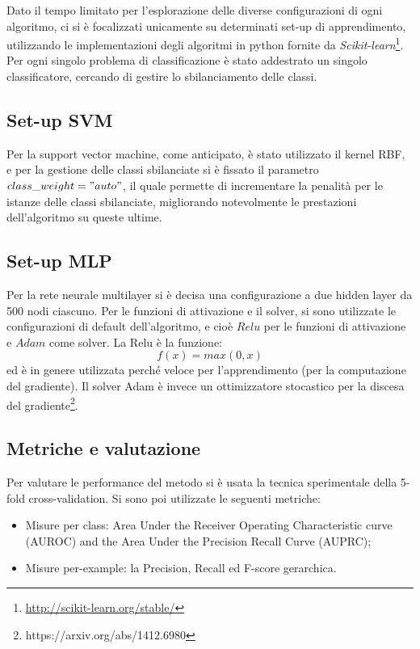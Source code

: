 \documentclass{article}
\begin{document}
Dato il tempo limitato per l'esplorazione delle diverse configurazioni di ogni algoritmo, ci si è focalizzati unicamente su determinati set-up di apprendimento, utilizzando le implementazioni degli algoritmi in python fornite da \textit{Scikit-learn}\footnote{\url{http://scikit-learn.org/stable/}}.
\newline
\newline
Per ogni singolo problema di classificazione è stato addestrato un singolo classificatore, cercando di gestire lo sbilanciamento delle classi.

\subsection{Set-up SVM}
Per la support vector machine, come anticipato, è stato utilizzato il kernel RBF, e per la gestione delle classi sbilanciate si è fissato il parametro $class\_weight="auto"$, il quale permette di incrementare la penalità per le istanze delle classi sbilanciate, migliorando notevolmente le prestazioni dell'algoritmo su queste ultime.

\subsection{Set-up MLP}
Per la rete neurale multilayer si è decisa una configurazione a due hidden layer da 500 nodi ciascuno.
\newline
\newline
Per le funzioni di attivazione e il solver, si sono utilizzate le configurazioni di default dell'algoritmo, e cioè $Relu$ per le funzioni di attivazione e $Adam$ come solver.
\newline
\newline
La Relu è la funzione:
\[
 f(x) = max(0, x)
 \]
ed è in genere utilizzata perché veloce per l'apprendimento (per la computazione del gradiente).
\newline
\newline
Il solver Adam è invece un ottimizzatore stocastico per la discesa del gradiente\footnote{https://arxiv.org/abs/1412.6980}.
\subsection{Metriche e valutazione}

Per valutare le performance del metodo si è usata la tecnica sperimentale della 5-fold
cross-validation.  Si sono poi utilizzate le seguenti metriche:

\begin{itemize}
\item Misure per  class:   Area  Under  the  Receiver  Operating  Characteristic
curve (AUROC) and the Area Under the Precision Recall Curve (AUPRC);
\item Misure per-example: la Precision, Recall ed F-score gerarchica.
\end{itemize}
\end{document}
